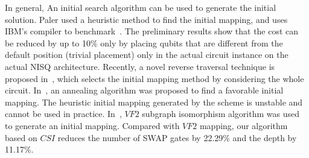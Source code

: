 \documentclass[runningheads]{llncs}
\begin{document}
In general, An initial search algorithm can be used to generate the initial solution. 
 Paler used a heuristic method to find the initial mapping, 
 and uses IBM's compiler to benchmark~\cite{Paler2018}. 
The preliminary results show that the cost can be reduced by up to 10\% only by placing qubits 
that are different from the default position (trivial placement) only in the actual circuit instance 
on the actual NISQ architecture. Recently, a novel reverse traversal technique is proposed in~\cite{Li2018}, 
which selects the initial mapping method by considering the whole circuit. 
In~\cite{Xiangzhen2020}, an annealing algorithm was proposed to find a favorable 
initial mapping. 
The heuristic initial mapping generated by the scheme is unstable 
and cannot be used in practice. In~\cite{2020Qubit}, 
$VF2$ subgraph isomorphism algorithm was 
used to generate an initial mapping. 
Compared with $VF2$ mapping, our algorithm 
based on $CSI$ reduces 
the number of SWAP gates by 22.29\% and the depth by 11.17\%.
\end{document}
